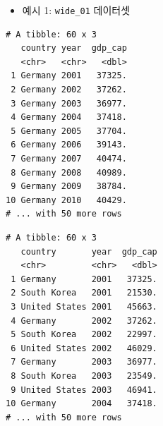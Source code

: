 \documentclass[
  11pt,
]{krantz}
\newenvironment{Shaded}{\begin{snugshade}}{\end{snugshade}}
\newcommand{\CommentTok}[1]{\textcolor[rgb]{0.37,0.37,0.37}{\textit{#1}}}
\newcommand{\DataTypeTok}[1]{\textcolor[rgb]{0.27,0.27,0.27}{#1}}
\newcommand{\DecValTok}[1]{\textcolor[rgb]{0.06,0.06,0.06}{#1}}
\newcommand{\KeywordTok}[1]{\textcolor[rgb]{0.27,0.27,0.27}{\textbf{#1}}}
\newcommand{\NormalTok}[1]{#1}
\newcommand{\OperatorTok}[1]{\textcolor[rgb]{0.43,0.43,0.43}{\textbf{#1}}}
\newcommand{\StringTok}[1]{\textcolor[rgb]{0.5,0.5,0.5}{#1}}
\providecommand{\tightlist}{%
  \setlength{\itemsep}{0pt}\setlength{\parskip}{0pt}}
\begin{document}
\begin{itemize}
\tightlist
\item
  예시 1: \texttt{wide\_01} 데이터셋
\end{itemize}

\footnotesize

\begin{Shaded}
\end{Shaded}

\begin{verbatim}
# A tibble: 60 x 3
   country year  gdp_cap
   <chr>   <chr>   <dbl>
 1 Germany 2001   37325.
 2 Germany 2002   37262.
 3 Germany 2003   36977.
 4 Germany 2004   37418.
 5 Germany 2005   37704.
 6 Germany 2006   39143.
 7 Germany 2007   40474.
 8 Germany 2008   40989.
 9 Germany 2009   38784.
10 Germany 2010   40429.
# ... with 50 more rows
\end{verbatim}

\begin{Shaded}
\end{Shaded}

\begin{verbatim}
# A tibble: 60 x 3
   country       year  gdp_cap
   <chr>         <chr>   <dbl>
 1 Germany       2001   37325.
 2 South Korea   2001   21530.
 3 United States 2001   45663.
 4 Germany       2002   37262.
 5 South Korea   2002   22997.
 6 United States 2002   46029.
 7 Germany       2003   36977.
 8 South Korea   2003   23549.
 9 United States 2003   46941.
10 Germany       2004   37418.
# ... with 50 more rows
\end{verbatim}
\end{document}
